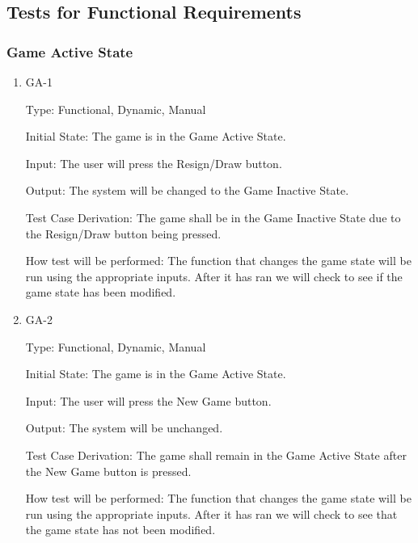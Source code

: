 \documentclass[12pt, titlepage]{article}
\begin{document}
\subsection{Tests for Functional Requirements}

\subsubsection{Game Active State}


\begin{enumerate}

\item{GA-1\\}

Type: Functional, Dynamic, Manual
                    
Initial State: The game is in the Game Active State.
                    
Input: The user will press the Resign/Draw button.
                    
Output: The system will be changed to the Game Inactive State.
                    
Test Case Derivation: The game shall be in the Game Inactive State due to the Resign/Draw button being pressed.

How test will be performed: The function that changes the game state will be run using the appropriate inputs.
After it has ran we will check to see if the game state has been modified.

\item{GA-2\\}

Type: Functional, Dynamic, Manual
                    
Initial State: The game is in the Game Active State.
                    
Input: The user will press the New Game button.
                    
Output: The system will be unchanged.
                    
Test Case Derivation: The game shall remain in the Game Active State after the New Game button is pressed.

How test will be performed: The function that changes the game state will be run using the appropriate inputs.
After it has ran we will check to see that the game state has not been modified.


\end{enumerate}
\end{document}
